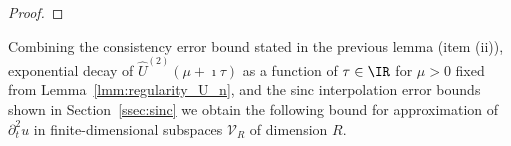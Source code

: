 \begin{proof}

\end{proof}
Combining the consistency error bound stated in the previous lemma (item (ii)), exponential decay of $\widehat{U}^{(2)}(\mu+\imath \tau)$ as a function of $\tau\in\IR$ for $\mu>0$ fixed from Lemma~\ref{lmm:regularity_U_n}, and the sinc interpolation error bounds shown in Section~\ref{ssec:sinc} we obtain the following bound for approximation of $\partial_t^2 u$ 
in finite-dimensional subspaces $\mathcal{V}_R$ of dimension $R$.

